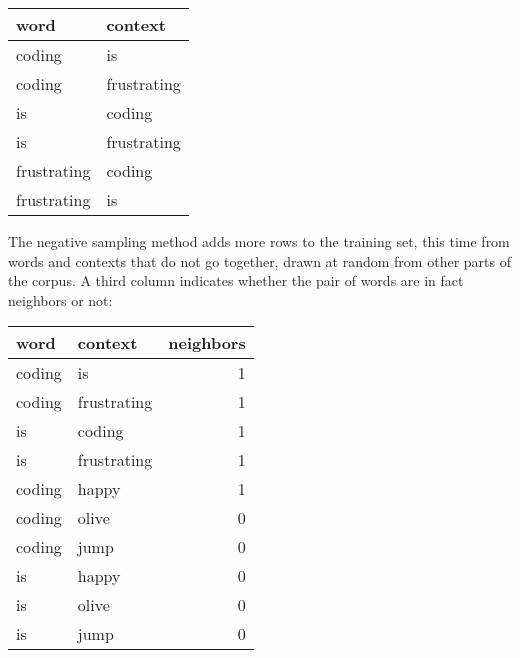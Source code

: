\documentclass[
  man,
  floatsintext,
  longtable,
  nolmodern,
  notxfonts,
  notimes,
  colorlinks=true,linkcolor=blue,citecolor=blue,urlcolor=blue]{apa7}
\begin{document}
\begin{table}

{\caption{{Example Skipgram Training Set}{\label{tbl-skipgram1}}}
\vspace{-20pt}}

\begin{longtable}[]{@{}ll@{}}
\toprule\noalign{}
word & context \\
\midrule\noalign{}
\endhead
\bottomrule\noalign{}
\endlastfoot
coding & is \\
coding & frustrating \\
is & coding \\
is & frustrating \\
frustrating & coding \\
frustrating & is \\
\end{longtable}

\end{table}

The negative sampling method adds more rows to the training set, this
time from words and contexts that do not go together, drawn at random
from other parts of the corpus. A third column indicates whether the
pair of words are in fact neighbors or not:

\begin{table}

{\caption{{Example Skipgram Training Set With Negative
Sampling}{\label{tbl-skipgram2}}}
\vspace{-20pt}}

\begin{longtable}[]{@{}llr@{}}
\toprule\noalign{}
word & context & neighbors \\
\midrule\noalign{}
\endhead
\bottomrule\noalign{}
\endlastfoot
coding & is & 1 \\
coding & frustrating & 1 \\
is & coding & 1 \\
is & frustrating & 1 \\
coding & happy & 1 \\
coding & olive & 0 \\
coding & jump & 0 \\
is & happy & 0 \\
is & olive & 0 \\
is & jump & 0 \\
\end{longtable}

\end{table}
\end{document}
